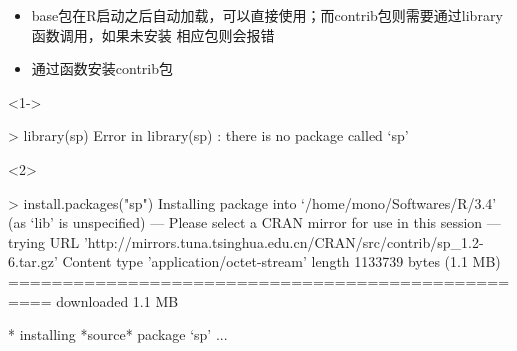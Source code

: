 \begin{frame}[t,fragile]{\subsecname}{\subsubsecname}
\begin{itemize}
\item<1-> base包在R启动之后自动加载，可以直接使用；而contrib包则需要通过library函数调用，如果未安装
               相应包则会报错
\item<2-> 通过函数安装contrib包
\end{itemize}

\begin{overlayarea}{\textwidth}{\textheight}
\begin{onlyenv}<1->
\begin{rcode}
> library(sp)
Error in library(sp) : there is no package called ‘sp’
\end{rcode}
\end{onlyenv}

\begin{onlyenv}<2>
\begin{rcode}
> install.packages("sp")
Installing package into ‘/home/mono/Softwares/R/3.4’
(as ‘lib’ is unspecified)
--- Please select a CRAN mirror for use in this session ---
trying URL 'http://mirrors.tuna.tsinghua.edu.cn/CRAN/src/contrib/sp_1.2-6.tar.gz'
Content type 'application/octet-stream' length 1133739 bytes (1.1 MB)
==================================================
downloaded 1.1 MB

* installing *source* package ‘sp’ ...
\end{rcode}
\end{onlyenv}
\end{overlayarea}
\end{frame}

